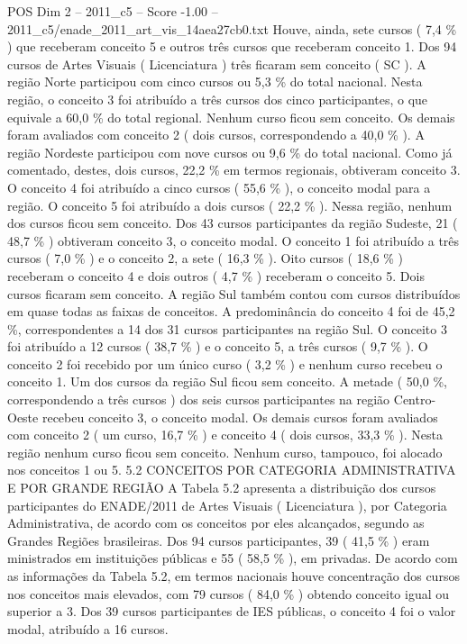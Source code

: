 \begin{textsample}{POS Dim 2 – 2011\_c5 – Score -1.00 – 2011\_c5/enade\_2011\_art\_vis\_14aea27cb0.txt}
Houve, ainda, sete cursos ( 7,4 \% ) que receberam conceito 5 e outros três cursos que receberam conceito 1.
Dos 94 cursos de Artes Visuais ( Licenciatura ) três ficaram sem conceito ( SC ).
A região Norte participou com cinco cursos ou 5,3 \% do total nacional.
Nesta região, o conceito 3 foi atribuído a três cursos dos cinco participantes, o que equivale a 60,0 \% do total regional.
Nenhum curso ficou sem conceito.
Os demais foram avaliados com conceito 2 ( dois cursos, correspondendo a 40,0 \% ).
A região Nordeste participou com nove cursos ou 9,6 \% do total nacional.
Como já comentado, destes, dois cursos, 22,2 \% em termos regionais, obtiveram conceito 3.
O conceito 4 foi atribuído a cinco cursos ( 55,6 \% ), o conceito modal para a região.
O conceito 5 foi atribuído a dois cursos ( 22,2 \% ).
Nessa região, nenhum dos cursos ficou sem conceito.
Dos 43 cursos participantes da região Sudeste, 21 ( 48,7 \% ) obtiveram conceito 3, o conceito modal.
O conceito 1 foi atribuído a três cursos ( 7,0 \% ) e o conceito 2, a sete ( 16,3 \% ).
Oito cursos ( 18,6 \% ) receberam o conceito 4 e dois outros ( 4,7 \% ) receberam o conceito 5.
Dois cursos ficaram sem conceito.
A região Sul também contou com cursos distribuídos em quase todas as faixas de conceitos.
A predominância do conceito 4 foi de 45,2 \%, correspondentes a 14 dos 31 cursos participantes na região Sul.
O conceito 3 foi atribuído a 12 cursos ( 38,7 \% ) e o conceito 5, a três cursos ( 9,7 \% ).
O conceito 2 foi recebido por um único curso ( 3,2 \% ) e nenhum curso recebeu o conceito 1.
Um dos cursos da região Sul ficou sem conceito.
A metade ( 50,0 \%, correspondendo a três cursos ) dos seis cursos participantes na região Centro-Oeste recebeu conceito 3, o conceito modal.
Os demais cursos foram avaliados com conceito 2 ( um curso, 16,7 \% ) e conceito 4 ( dois cursos, 33,3 \% ).
Nesta região nenhum curso ficou sem conceito.
Nenhum curso, tampouco, foi alocado nos conceitos 1 ou 5. 5.2 CONCEITOS POR CATEGORIA ADMINISTRATIVA E POR GRANDE REGIÃO A Tabela 5.2 apresenta a distribuição dos cursos participantes do ENADE/2011 de Artes Visuais ( Licenciatura ), por Categoria Administrativa, de acordo com os conceitos por eles alcançados, segundo as Grandes Regiões brasileiras.
Dos 94 cursos participantes, 39 ( 41,5 \% ) eram ministrados em instituições públicas e 55 ( 58,5 \% ), em privadas.
De acordo com as informações da Tabela 5.2, em termos nacionais houve concentração dos cursos nos conceitos mais elevados, com 79 cursos ( 84,0 \% ) obtendo conceito igual ou superior a 3.
Dos 39 cursos participantes de IES públicas, o conceito 4 foi o valor modal, atribuído a 16 cursos.

\end{textsample}
